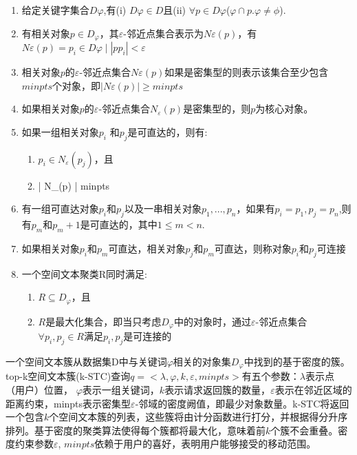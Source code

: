 \begin{enumerate}[labelwidth=1.5cm,labelindent=10pt,leftmargin=2.2cm,label=\bfseries 定义 \arabic*:,align=left]
  \setcounter{enumi}{0}%
  \item 给定关键字集合$D\varphi$,有(i) $D\varphi \in D$且(ii) $\forall p \in D\varphi$($\varphi \cap p. \varphi\neq\phi$).
  \item 有相关对象$p \in D_{\varphi}$，其$\varepsilon$-邻近点集合表示为$N\varepsilon(p)$，有$N\varepsilon(p) = { p_{i}\in D\varphi \mid \left| pp_{i}\right| < \varepsilon }$
  \item 相关对象$p$的$ \varepsilon $-邻近点集合$N \varepsilon (p)$如果是密集型的则表示该集合至少包含$minpts$个对象，即$\left| N \varepsilon (p) \right| \geq minpts$
  \item 如果相关对象$p$的$\varepsilon$-邻近点集合$N_{\varepsilon}(p)$是密集型的，则$p$为核心对象。
  \item 如果一组相关对象$p_{i}$ 和$p_{j}$是可直达的，则有: 
  \begin{enumerate}
		\item $p_{i} \in  N_{\varepsilon}(p_{j})$，且
		\item \left| N_{\varepsilon}(p) \right| \geq minpts
	\end{enumerate}
	
	\item 有一组可直达对象$p_{i}$和$p_{j}$以及一串相关对象$p_{1}, ..., p_{n}$，如果有$p_{i} = p_{1}, p_{j} = p_{n}$,则有$p_{m}和p_{m}+1$是可直达的，其中$1 \leq m < n.$ 

	\item 如果相关对象$p_{i}$和$p_{m}$可直达，相关对象$p_{j}$和$p_{m}$可直达，则称对象$p_{i}$和$p_{j}$可连接

	\item 一个空间文本聚类R同时满足: 
	\begin{enumerate}
		\item $R \subseteq D_{\varphi}$，且
		\item $R$是最大化集合，即当只考虑$D_{\varphi}$中的对象时，通过$\varepsilon$-邻近点集合$\forall p_{i},p_{j} \in R$满足$p_{i},p_{j}$是可连接的
	\end{enumerate}

\end{enumerate}

一个空间文本簇从数据集D中与关键词$\varphi$相关的对象集$D_{\varphi}$中找到的基于密度的簇。top-k空间文本簇(k-STC)查询$q =<\lambda, \varphi, k, \varepsilon, minpts>$有五个参数：$\lambda$表示点（用户）位置， $\varphi$表示一组关键词，$k$表示请求返回簇的数量，$\varepsilon$表示在邻近区域的距离约束，minpts表示密集型$\varepsilon$-邻域的密度阙值，即最少对象数量。k-STC将返回一个包含$k$个空间文本簇的列表，这些簇将由计分函数进行打分，并根据得分升序排列。基于密度的聚类算法使得每个簇都将最大化，意味着前$k$个簇不会重叠。密度约束参数$\varepsilon$, $minpts$依赖于用户的喜好，表明用户能够接受的移动范围。

